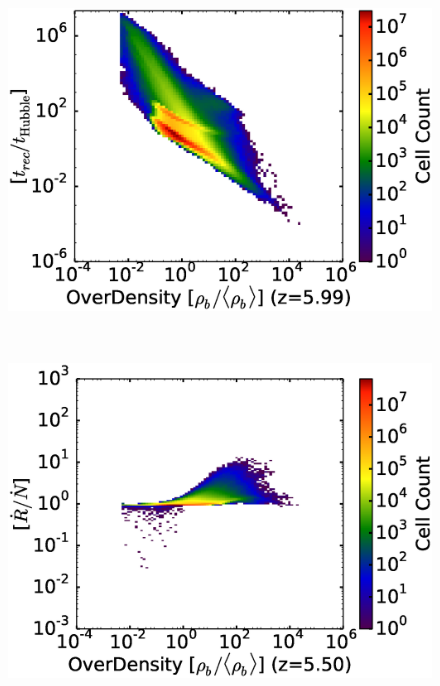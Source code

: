 \begin{figure}[!tp]
\begin{minipage}[h]{0.33\linewidth}
       \includegraphics[trim = 5mm 8mm 0mm 0mm, clip, width=1.0\textwidth]{3_3_HD15100OverDensityRecombHubbleTime.eps}
    \end{minipage}
\\
     \begin{minipage}[h]{0.33\linewidth}
        \centering
        \includegraphics[trim = 5mm 8mm 0mm 0mm, clip, width=1.0\textwidth]{4_1_HD20125OverDensityRecombIonFrac.eps}
     \end{minipage}
\hspace*{-2.00mm}
    \begin{minipage}[h]{0.33\linewidth}
       \centering

\end{minipage}
\end{figure}
